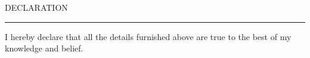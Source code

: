 \documentclass{resume} %
\renewenvironment{rSection}[1]{
\sectionskip
\textcolor{TsinghuaPurple}{\MakeUppercase{#1}}
\sectionlineskip
\hrule
\begin{list}{}{
\setlength{\leftmargin}{0em}
}
\item[]
}{
\end{list}
}
\begin{document}

\begin{rSection}{ Declaration  } \itemsep -3pt        

\item I hereby declare that all the details furnished above are true to the best of my knowledge and belief.   
  
\end{rSection}
\end{document}
